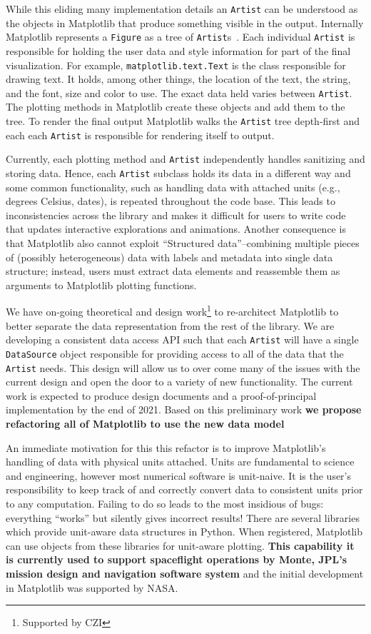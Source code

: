 \documentclass[12pt]{article}
\numberwithin{page}{section}
\begin{document}
While this eliding many implementation details an \texttt{Artist} can
be understood as the objects in Matplotlib that produce something
visible in the output.  Internally Matplotlib represents a
\texttt{Figure} as a tree of \texttt{Artist}s~\cite{AOSA_mpl}.  Each
individual \texttt{Artist} is responsible for holding the user data
and style information for part of the final visualization.  For
example, \texttt{matplotlib.text.Text} is the class responsible for
drawing text.  It holds, among other things, the location of the text,
the string, and the font, size and color to use.  The exact data held
varies between \texttt{Artist}.  The plotting methods in Matplotlib
create these objects and add them to the tree.  To render the final
output Matplotlib walks the \texttt{Artist} tree depth-first and each
each \texttt{Artist} is responsible for rendering itself to output.

Currently, each plotting method and \texttt{Artist} independently
handles sanitizing and storing data.  Hence, each \texttt{Artist}
subclass holds its data in a different way and some common
functionality, such as handling data with attached units (e.g.,
degrees Celsius, dates), is repeated throughout the code base.  This
leads to inconsistencies across the library and makes it difficult for
users to write code that updates interactive explorations and
animations.  Another consequence is that Matplotlib also cannot
exploit ``Structured data''--combining multiple pieces of (possibly
heterogeneous) data with labels and metadata into single data
structure; instead, users must extract data elements and reassemble
them as arguments to Matplotlib plotting functions.

We have on-going theoretical and design work\footnote{Supported by
CZI} to re-architect Matplotlib to better separate the data
representation from the rest of the library.  We are developing a
consistent data access API such that each \texttt{Artist} will have a
single \texttt{DataSource} object responsible for providing access to
all of the data that the \texttt{Artist} needs.  This design will
allow us to over come many of the issues with the current design and
open the door to a variety of new functionality.  The current work is
expected to produce design documents and a proof-of-principal
implementation by the end of 2021.  Based on this preliminary work
\textbf{we propose refactoring all of Matplotlib to use the new data
  model}

An immediate motivation for this this refactor is to
improve Matplotlib's handling of data with physical units attached.
Units are fundamental to science and engineering, however most
numerical software is unit-naive.  It is the user's responsibility to
keep track of and correctly convert data to consistent units prior to
any computation.  Failing to do so leads to the most insidious of
bugs: everything ``works'' but silently gives incorrect results!
There are several libraries which provide unit-aware data structures
in Python.  When registered, Matplotlib can use objects from these
libraries for unit-aware plotting.  \textbf{This capability it is
  currently used to support spaceflight operations by Monte, JPL's
  mission design and navigation software system} and the initial
development in Matplotlib was supported by NASA.
\end{document}
